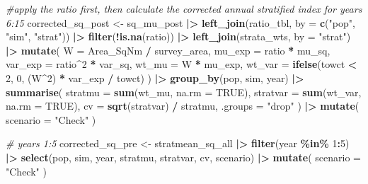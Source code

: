 \documentclass[
]{article}
\newenvironment{Shaded}{\begin{snugshade}}{\end{snugshade}}
\newcommand{\AttributeTok}[1]{\textcolor[rgb]{0.13,0.29,0.53}{#1}}
\newcommand{\CommentTok}[1]{\textcolor[rgb]{0.56,0.35,0.01}{\textit{#1}}}
\newcommand{\ConstantTok}[1]{\textcolor[rgb]{0.56,0.35,0.01}{#1}}
\newcommand{\DecValTok}[1]{\textcolor[rgb]{0.00,0.00,0.81}{#1}}
\newcommand{\FunctionTok}[1]{\textcolor[rgb]{0.13,0.29,0.53}{\textbf{#1}}}
\newcommand{\NormalTok}[1]{#1}
\newcommand{\OtherTok}[1]{\textcolor[rgb]{0.56,0.35,0.01}{#1}}
\newcommand{\SpecialCharTok}[1]{\textcolor[rgb]{0.81,0.36,0.00}{\textbf{#1}}}
\newcommand{\StringTok}[1]{\textcolor[rgb]{0.31,0.60,0.02}{#1}}
\begin{document}
\begin{Shaded}
\begin{Highlighting}[]
\CommentTok{\#apply the ratio first, then calculate the corrected annual stratified index for years 6:15}
\NormalTok{corrected\_sq\_post }\OtherTok{\textless{}{-}}\NormalTok{ sq\_mu\_post }\SpecialCharTok{|\textgreater{}}
  \FunctionTok{left\_join}\NormalTok{(ratio\_tbl, }\AttributeTok{by =} \FunctionTok{c}\NormalTok{(}\StringTok{"pop"}\NormalTok{, }\StringTok{"sim"}\NormalTok{, }\StringTok{"strat"}\NormalTok{)) }\SpecialCharTok{|\textgreater{}}
  \FunctionTok{filter}\NormalTok{(}\SpecialCharTok{!}\FunctionTok{is.na}\NormalTok{(ratio)) }\SpecialCharTok{|\textgreater{}}
  \FunctionTok{left\_join}\NormalTok{(strata\_wts, }\AttributeTok{by =} \StringTok{"strat"}\NormalTok{) }\SpecialCharTok{|\textgreater{}}
  \FunctionTok{mutate}\NormalTok{(}
    \AttributeTok{W =}\NormalTok{ Area\_SqNm }\SpecialCharTok{/}\NormalTok{ survey\_area,}
    \AttributeTok{mu\_exp =}\NormalTok{ ratio }\SpecialCharTok{*}\NormalTok{ mu\_sq,}
    \AttributeTok{var\_exp =}\NormalTok{ ratio}\SpecialCharTok{\^{}}\DecValTok{2} \SpecialCharTok{*}\NormalTok{ var\_sq,}
    \AttributeTok{wt\_mu =}\NormalTok{ W }\SpecialCharTok{*}\NormalTok{ mu\_exp,}
    \AttributeTok{wt\_var =} \FunctionTok{ifelse}\NormalTok{(towct }\SpecialCharTok{\textless{}} \DecValTok{2}\NormalTok{, }\DecValTok{0}\NormalTok{, (W}\SpecialCharTok{\^{}}\DecValTok{2}\NormalTok{) }\SpecialCharTok{*}\NormalTok{ var\_exp }\SpecialCharTok{/}\NormalTok{ towct)}
\NormalTok{  ) }\SpecialCharTok{|\textgreater{}}
  \FunctionTok{group\_by}\NormalTok{(pop, sim, year) }\SpecialCharTok{|\textgreater{}}
  \FunctionTok{summarise}\NormalTok{(}
    \AttributeTok{stratmu =} \FunctionTok{sum}\NormalTok{(wt\_mu, }\AttributeTok{na.rm =} \ConstantTok{TRUE}\NormalTok{),}
    \AttributeTok{stratvar =} \FunctionTok{sum}\NormalTok{(wt\_var, }\AttributeTok{na.rm =} \ConstantTok{TRUE}\NormalTok{),}
    \AttributeTok{cv =} \FunctionTok{sqrt}\NormalTok{(stratvar) }\SpecialCharTok{/}\NormalTok{ stratmu,}
    \AttributeTok{.groups =} \StringTok{"drop"}
\NormalTok{  ) }\SpecialCharTok{|\textgreater{}}
  \FunctionTok{mutate}\NormalTok{(}
    \AttributeTok{scenario =} \StringTok{"Check"}
\NormalTok{  )}


\CommentTok{\# years 1:5 }
\NormalTok{corrected\_sq\_pre }\OtherTok{\textless{}{-}}\NormalTok{ stratmean\_sq\_all }\SpecialCharTok{|\textgreater{}}
  \FunctionTok{filter}\NormalTok{(year }\SpecialCharTok{\%in\%} \DecValTok{1}\SpecialCharTok{:}\DecValTok{5}\NormalTok{) }\SpecialCharTok{|\textgreater{}}
  \FunctionTok{select}\NormalTok{(pop, sim, year, stratmu, stratvar, cv, scenario) }\SpecialCharTok{|\textgreater{}}
  \FunctionTok{mutate}\NormalTok{(}
    \AttributeTok{scenario =} \StringTok{"Check"}
\NormalTok{  )}


\end{Highlighting}
\end{Shaded}
\end{document}
